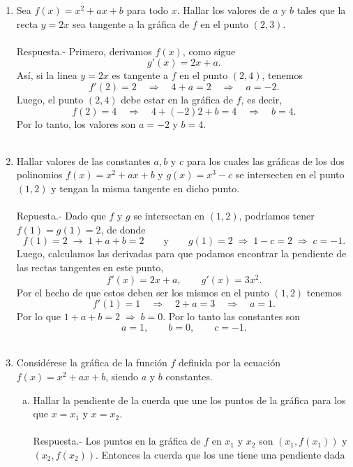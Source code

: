 \begin{enumerate}[\bfseries 1.]
    \item Sea $f(x)=x^2+ax+b$ para todo $x$. Hallar los valores de $a$ y $b$ tales que la recta $y=2x$ sea tangente a la gráfica de $f$ en el punto $(2,3)$.\\\\
	Respuesta.-\; Primero, derivamos $f(x)$, como sigue
	$$g'(x)=2x+a.$$
	Así, si la linea $y=2x$ es tangente a $f$ en el punto $(2,4)$, tenemos
	$$f'(2)=2\quad \Rightarrow \quad 4+a=2 \quad \Rightarrow \quad a=-2.$$
	Luego, el punto $(2,4)$ debe estar en la gráfica de $f$, es decir, 
	$$f(2)=4\quad \Rightarrow \quad 4+(-2)2+b=4 \quad \Rightarrow \quad b=4.$$
	Por lo tanto, los valores son $a=-2$ y $b=4$.\\\\

    \item Hallar valores de las constantes $a,b$ y $c$ para los cuales las gráficas de los dos polinomios $f(x)=x^2+ax+b$ y $g(x)=x^3-c$ se intersecten en el punto $(1,2)$ y tengan la misma tangente en dicho punto.\\\\
	Repuesta.-\; Dado que $f$ y $g$ se intersectan en $(1,2)$, podríamos tener $f(1)=g(1)=2$, de donde 
	$$f(1)=2\;\rightarrow \; 1+a+b=2\qquad \mbox{y}\qquad g(1)=2\; \Rightarrow \; 1-c=2 \; \Rightarrow \; c=-1.$$
	Luego, calculamos las derivadas para que podamos encontrar la pendiente de las rectas tangentes en este punto,
	$$f'(x)=2x+a,\qquad g'(x)=3x^2.$$
	Por el hecho de que estos deben ser los mismos en el punto $(1,2)$ tenemos
	$$f'(1)=1\quad \Rightarrow \quad 2+a=3\quad \Rightarrow \quad a=1.$$
	Por lo que $1+a+b=2\; \Rightarrow \; b=0.$ Por lo tanto las constantes son
	$$a=1,\qquad b=0,\qquad c=-1.$$\\

    \item Considérese la gráfica de la función $f$ definida por la ecuación $f(x)=x^2+ax+b$, siendo $a$ y $b$ constantes.

	\begin{enumerate}[(a)]

	    \item Hallar la pendiente de la cuerda que une los puntos de la gráfica para los que $x=x_1$ y $x=x_2$.\\\\
		Respuesta.-\; Los puntos en la gráfica de $f$ en $x_1$ y $x_2$ son $\left(x_1,f(x_1)\right)$ y $\left(x_2,f(x_2)\right)$. Entonces la cuerda que los une tiene una pendiente dada 


\end{enumerate}
\end{enumerate}
